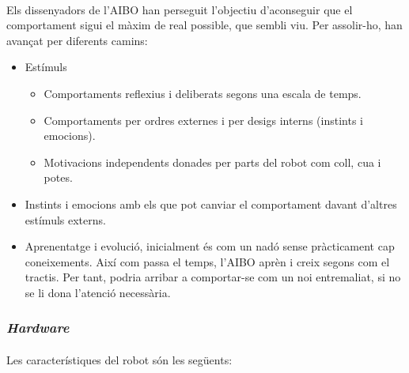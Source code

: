 \documentclass[12pt,a4paper,final,twoside]{article}
\begin{document}
\paragraph{}Els dissenyadors de l'AIBO han perseguit l'objectiu d'aconseguir que el comportament sigui el màxim de real possible, que sembli viu. Per assolir-ho, han avançat per diferents camins:
\begin{itemize}
\item Estímuls
\begin{itemize}
\item Comportaments reflexius i deliberats segons una escala de temps.
\item Comportaments per ordres externes i per desigs interns (instints i emocions).
\item Motivacions independents donades per parts del robot com coll, cua i potes.
\end{itemize}
\item Instints i emocions amb els que pot canviar el comportament davant d'altres estímuls externs.
\item Aprenentatge i evolució, inicialment és com un nadó sense pràcticament cap coneixements. Així com passa el temps, l'AIBO aprèn i creix segons com el tractis. Per tant, podria arribar a comportar-se com un noi entremaliat, si no se li dona l'atenció necessària.
\end{itemize}

\subsubsection{\textit{Hardware}}

\paragraph{}Les característiques del robot són les següents: \cite{Anshar2007}
\end{document}
